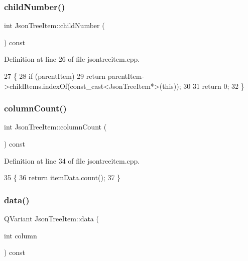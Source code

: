 \subsubsection{\texorpdfstring{child\+Number()}{childNumber()}}
{\footnotesize\ttfamily int Json\+Tree\+Item\+::child\+Number (\begin{DoxyParamCaption}{ }\end{DoxyParamCaption}) const}



Definition at line 26 of file jsontreeitem.\+cpp.


\begin{DoxyCode}
27 \{
28     \textcolor{keywordflow}{if} (parentItem)
29         \textcolor{keywordflow}{return} parentItem->childItems.indexOf(const\_cast<JsonTreeItem*>(\textcolor{keyword}{this}));
30 
31     \textcolor{keywordflow}{return} 0;
32 \}
\end{DoxyCode}
\mbox{\label{class_json_tree_item_ad66ee4ac09255aa32fb05ffbd4057413}} 
\subsubsection{\texorpdfstring{column\+Count()}{columnCount()}}
{\footnotesize\ttfamily int Json\+Tree\+Item\+::column\+Count (\begin{DoxyParamCaption}{ }\end{DoxyParamCaption}) const}



Definition at line 34 of file jsontreeitem.\+cpp.


\begin{DoxyCode}
35 \{
36     \textcolor{keywordflow}{return} itemData.count();
37 \}
\end{DoxyCode}
\mbox{\label{class_json_tree_item_a3cd46e11efb01a8c7f59d6bf3c4582d4}} 
\subsubsection{\texorpdfstring{data()}{data()}}
{\footnotesize\ttfamily Q\+Variant Json\+Tree\+Item\+::data (\begin{DoxyParamCaption}\item[{int}]{column }\end{DoxyParamCaption}) const}



